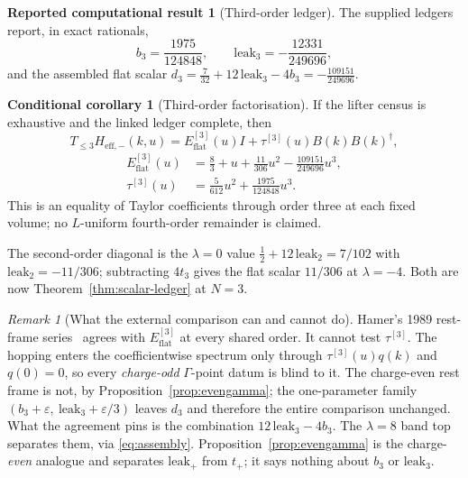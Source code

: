 \documentclass[11pt]{article}
\theoremstyle{plain}
\theoremstyle{definition}
\newtheorem{reported}[theorem]{Reported computational result}
\newtheorem{conditional}[theorem]{Conditional corollary}
\theoremstyle{remark}
\newtheorem{remark}[theorem]{Remark}
\newcommand{\chk}[1]{}
\newcommand{\dg}{^{\dagger}}
\begin{document}
\begin{reported}[Third-order ledger]\label{rep:su3}
The supplied ledgers report, in exact rationals,
\[
  b_3=\frac{1975}{124848},\qquad
  \mathrm{leak}_3=-\frac{12331}{249696},
\]
and the assembled flat scalar
$d_3=\tfrac7{32}+12\,\mathrm{leak}_3-4b_3=-\tfrac{109151}{249696}$.
\end{reported}
\chk{d\_3 = 7/32 + 12*leak\_3 - 4*b\_3}
\chk{leak\_3 is assembled from the domino diagonal and the vacuum piece}

\begin{conditional}[Third-order factorisation]\label{cor:su3}
If the lifter census is exhaustive and the linked ledger complete, then
\[
  T_{\le3}H_{\mathrm{eff},-}(k,u)
  =E_{\mathrm{flat}}^{[3]}(u)I+\tau^{[3]}(u)B(k)B(k)\dg,
\]
\[
  \begin{aligned}
    E_{\mathrm{flat}}^{[3]}(u)&=\tfrac83+u+\tfrac{11}{306}u^2-\tfrac{109151}{249696}u^3,\\
    \tau^{[3]}(u)&=\tfrac5{612}u^2+\tfrac{1975}{124848}u^3 .
  \end{aligned}
\]
This is an equality of Taylor coefficients through order three at each fixed
volume; no $L$-uniform fourth-order remainder is claimed.
\end{conditional}
\chk{E\_flat and t(u) carry the ledger coefficients}

The second-order diagonal is the $\lambda=0$ value
$\tfrac12+12\,\mathrm{leak}_2=7/102$ with $\mathrm{leak}_2=-11/306$;
subtracting $4t_3$ gives the flat scalar $11/306$ at $\lambda=-4$. Both are
now Theorem~\ref{thm:scalar-ledger} at $N=3$.
\chk{d\_- = 1/2 + 12*leak\_2, and leak\_2 = -11/306}

\begin{remark}[What the external comparison can and cannot do]
Hamer's 1989 rest-frame series~\cite{Hamer1989} agrees with
$E_{\mathrm{flat}}^{[3]}$ at every shared order. It cannot test
$\tau^{[3]}$. The hopping enters the coefficientwise spectrum only through
$\tau^{[3]}(u)q(k)$ and $q(0)=0$, so every \emph{charge-odd}
$\Gamma$-point datum is blind to it. The charge-even rest frame is not, by
Proposition~\ref{prop:evengamma}; the one-parameter family
$(b_3+\varepsilon,\ \mathrm{leak}_3+\varepsilon/3)$ leaves $d_3$ and therefore
the entire comparison unchanged. What the agreement pins is the combination
$12\,\mathrm{leak}_3-4b_3$. The $\lambda=8$ band top separates them, via \eqref{eq:assembly}.
Proposition~\ref{prop:evengamma} is the charge-\emph{even} analogue and
separates $\mathrm{leak}_+$ from $t_+$; it says nothing about $b_3$ or
$\mathrm{leak}_3$.
\chk{FINDING: no Gamma-point datum can constrain the hopping}
\end{remark}
\end{document}
